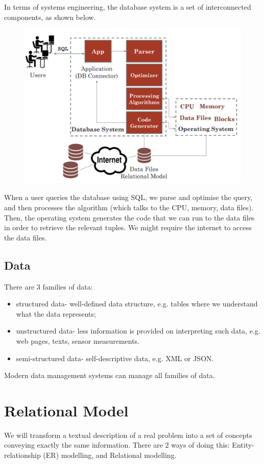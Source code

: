 \documentclass[a4paper, openany]{memoir}
\begin{document}
In terms of systems engineering, the database system is a set of interconnected components, as shown below.
\begin{figure}[H]
    \centering
    \includegraphics[scale=0.4]{src/Database Systems SE.PNG}
\end{figure}
\noindent When a user queries the database using SQL, we parse and optimise the query, and then processes the algorithm (which talks to the CPU, memory, data files). Then, the operating system generates the code that we can run to the data files in order to retrieve the relevant tuples. We might require the internet to access the data files.

\subsection{Data}
There are 3 families of data:
\begin{itemize}
    \item structured data- well-defined data structure, e.g. tables where we understand what the data represents;
    \item unstructured data- less information is provided on interpreting such data, e.g. web pages, texts, sensor measurements.
    \item semi-structured data- self-descriptive data, e.g. XML or JSON.
\end{itemize}
Modern data management systems can manage all families of data.

\newpage

\section{Relational Model}
We will transform a textual description of a real problem into a set of concepts conveying exactly the same information. There are 2 ways of doing this: Entity-relationship (ER) modelling, and Relational modelling. 
\end{document}
